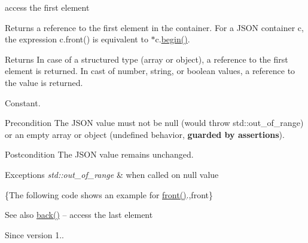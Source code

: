 access the first element 

Returns a reference to the first element in the container. For a J\+S\+ON container {\ttfamily c}, the expression {\ttfamily c.\+front()} is equivalent to {\ttfamily $\ast$c.\hyperlink{classnlohmann_1_1basic__json_ad4e381c54039607be08d7af41a1f6ad1}{begin()}}.

\begin{DoxyReturn}{Returns}
In case of a structured type (array or object), a reference to the first element is returned. In cast of number, string, or boolean values, a reference to the value is returned.
\end{DoxyReturn}
Constant.

\begin{DoxyPrecond}{Precondition}
The J\+S\+ON value must not be {\ttfamily null} (would throw {\ttfamily std\+::out\+\_\+of\+\_\+range}) or an empty array or object (undefined behavior, {\bfseries guarded by assertions}). 
\end{DoxyPrecond}
\begin{DoxyPostcond}{Postcondition}
The J\+S\+ON value remains unchanged.
\end{DoxyPostcond}

\begin{DoxyExceptions}{Exceptions}
{\em std\+::out\+\_\+of\+\_\+range} & when called on {\ttfamily null} value\\
\hline
\end{DoxyExceptions}
\{The following code shows an example for {\ttfamily \hyperlink{classnlohmann_1_1basic__json_aa45753034bea87f9d2c0c42ace9ff75c}{front()}}.,front\}

\begin{DoxySeeAlso}{See also}
\hyperlink{classnlohmann_1_1basic__json_a71b1d38ef402dfee58fba1fe01fa67f5}{back()} -- access the last element
\end{DoxySeeAlso}
\begin{DoxySince}{Since}
version 1.. 
\end{DoxySince}
\hypertarget{classnlohmann_1_1basic__json_a2256d4912473af915739ddde259c7ca8}{}\label{classnlohmann_1_1basic__json_a2256d4912473af915739ddde259c7ca8} 
